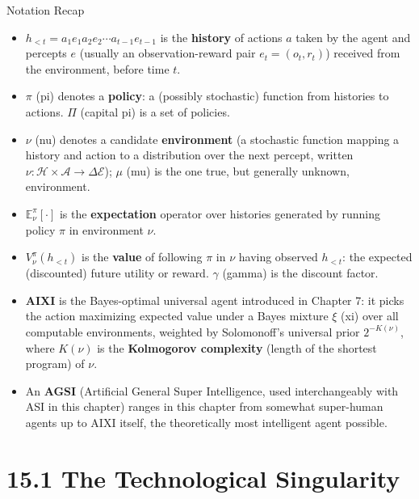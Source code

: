\documentclass[aspectratio=169,10pt]{beamer}
\newcommand{\Ac}{\mathcal{A}}
\newcommand{\Ec}{\mathcal{E}}
\newcommand{\Hc}{\mathcal{H}}
\newcommand{\hlt}{h_{<t}}
\begin{document}
\begin{frame}{Notation Recap}
  \begin{itemize}
    \item $\hlt = a_1e_1a_2e_2\cdots a_{t-1}e_{t-1}$ is the \textbf{history}
      of actions $a$ taken by the agent and percepts $e$ (usually an
      observation-reward pair $e_t=(o_t,r_t)$) received from the
      environment, before time $t$.
    \item $\pi$ (pi) denotes a \textbf{policy}: a (possibly stochastic)
      function from histories to actions. $\Pi$ (capital pi) is a set of
      policies.
    \item $\nu$ (nu) denotes a candidate \textbf{environment} (a
      stochastic function mapping a history and action to a distribution
      over the next percept, written $\nu:\Hc\times\Ac\to\Delta\Ec$);
      $\mu$ (mu) is the one true, but generally unknown, environment.
    \item $\mathbb{E}^\pi_\nu[\cdot]$ is the \textbf{expectation} operator
      over histories generated by running policy $\pi$ in environment
      $\nu$.
    \item $V^\pi_\nu(\hlt)$ is the \textbf{value} of following $\pi$ in
      $\nu$ having observed $\hlt$: the expected (discounted) future
      utility or reward. $\gamma$ (gamma) is the discount factor.
    \item \textbf{AIXI} is the Bayes-optimal universal agent introduced in
      Chapter 7: it picks the action maximizing expected value under a
      Bayes mixture $\xi$ (xi) over all computable environments,
      weighted by Solomonoff's universal prior $2^{-K(\nu)}$, where
      $K(\nu)$ is the \textbf{Kolmogorov complexity} (length of the
      shortest program) of $\nu$.
    \item An \textbf{AGSI} (Artificial General Super Intelligence, used
      interchangeably with ASI in this chapter) ranges in this chapter from
      somewhat super-human agents up to AIXI itself, the theoretically most
      intelligent agent possible.
  \end{itemize}
\end{frame}

\section{15.1 The Technological Singularity}
\end{document}
